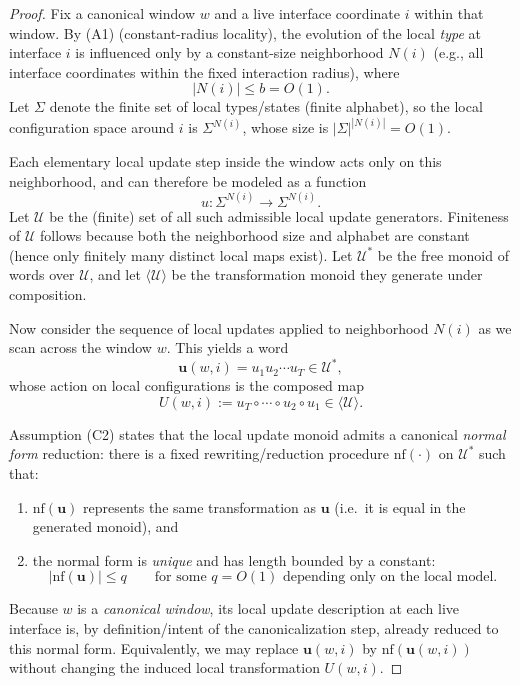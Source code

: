 \documentclass[12pt]{article}
\theoremstyle{definition}
\theoremstyle{remark}
\begin{document}
\begin{proof}
Fix a canonical window $w$ and a live interface coordinate $i$ within that window.
By (A1) (constant-radius locality), the evolution of the local \emph{type} at
interface $i$ is influenced only by a constant-size neighborhood $N(i)$ (e.g.,
all interface coordinates within the fixed interaction radius), where
\[
|N(i)| \le b = O(1).
\]
Let $\Sigma$ denote the finite set of local types/states (finite alphabet), so the
local configuration space around $i$ is $\Sigma^{N(i)}$, whose size is
$|\Sigma|^{|N(i)|}=O(1)$.

Each elementary local update step inside the window acts only on this neighborhood,
and can therefore be modeled as a function
\[
u:\Sigma^{N(i)} \to \Sigma^{N(i)}.
\]
Let $\mathcal{U}$ be the (finite) set of all such admissible local update
generators. Finiteness of $\mathcal{U}$ follows because both the neighborhood size
and alphabet are constant (hence only finitely many distinct local maps exist).
Let $\mathcal{U}^*$ be the free monoid of words over $\mathcal{U}$, and let
$\langle \mathcal{U}\rangle$ be the transformation monoid they generate under
composition.

Now consider the sequence of local updates applied to neighborhood $N(i)$ as we
scan across the window $w$. This yields a word
\[
\mathbf{u}(w,i) = u_1 u_2 \cdots u_T \in \mathcal{U}^*,
\]
whose action on local configurations is the composed map
\[
U(w,i) := u_T \circ \cdots \circ u_2 \circ u_1 \in \langle \mathcal{U}\rangle.
\]

Assumption (C2) states that the local update monoid admits a canonical
\emph{normal form} reduction: there is a fixed rewriting/reduction procedure
$\mathrm{nf}(\cdot)$ on $\mathcal{U}^*$ such that:
\begin{enumerate}
\item $\mathrm{nf}(\mathbf{u})$ represents the same transformation as $\mathbf{u}$
      (i.e.\ it is equal in the generated monoid), and
\item the normal form is \emph{unique} and has length bounded by a constant:
      \[
      |\mathrm{nf}(\mathbf{u})| \le q
      \qquad\text{for some } q=O(1) \text{ depending only on the local model.}
      \]
\end{enumerate}
Because $w$ is a \emph{canonical window}, its local update description at each live
interface is, by definition/intent of the canonicalization step, already reduced to
this normal form. Equivalently, we may replace $\mathbf{u}(w,i)$ by
$\mathrm{nf}(\mathbf{u}(w,i))$ without changing the induced local transformation
$U(w,i)$.


\end{proof}
\end{document}
